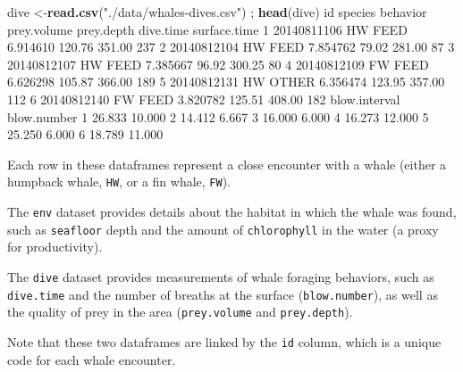 \documentclass[]{book}
\newenvironment{Shaded}{\begin{snugshade}}{\end{snugshade}}
\newcommand{\DecValTok}[1]{\textcolor[rgb]{0.00,0.00,0.81}{#1}}
\newcommand{\FloatTok}[1]{\textcolor[rgb]{0.00,0.00,0.81}{#1}}
\newcommand{\KeywordTok}[1]{\textcolor[rgb]{0.13,0.29,0.53}{\textbf{#1}}}
\newcommand{\NormalTok}[1]{#1}
\newcommand{\StringTok}[1]{\textcolor[rgb]{0.31,0.60,0.02}{#1}}
\begin{document}
\begin{Shaded}
\begin{Highlighting}[]
\NormalTok{dive <-}\KeywordTok{read.csv}\NormalTok{(}\StringTok{"./data/whales-dives.csv"}\NormalTok{) ; }\KeywordTok{head}\NormalTok{(dive)}
\NormalTok{           id species behavior prey.volume prey.depth dive.time surface.time}
\DecValTok{1} \DecValTok{20140811106}\NormalTok{      HW     FEED    }\FloatTok{6.914610}     \FloatTok{120.76}    \FloatTok{351.00}          \DecValTok{237}
\DecValTok{2} \DecValTok{20140812104}\NormalTok{      HW     FEED    }\FloatTok{7.854762}      \FloatTok{79.02}    \FloatTok{281.00}           \DecValTok{87}
\DecValTok{3} \DecValTok{20140812107}\NormalTok{      HW     FEED    }\FloatTok{7.385667}      \FloatTok{96.92}    \FloatTok{300.25}           \DecValTok{80}
\DecValTok{4} \DecValTok{20140812109}\NormalTok{      FW     FEED    }\FloatTok{6.626298}     \FloatTok{105.87}    \FloatTok{366.00}          \DecValTok{189}
\DecValTok{5} \DecValTok{20140812131}\NormalTok{      HW    OTHER    }\FloatTok{6.356474}     \FloatTok{123.95}    \FloatTok{357.00}          \DecValTok{112}
\DecValTok{6} \DecValTok{20140812140}\NormalTok{      FW     FEED    }\FloatTok{3.820782}     \FloatTok{125.51}    \FloatTok{408.00}          \DecValTok{182}
\NormalTok{  blow.interval blow.number}
\DecValTok{1}        \FloatTok{26.833}      \FloatTok{10.000}
\DecValTok{2}        \FloatTok{14.412}       \FloatTok{6.667}
\DecValTok{3}        \FloatTok{16.000}       \FloatTok{6.000}
\DecValTok{4}        \FloatTok{16.273}      \FloatTok{12.000}
\DecValTok{5}        \FloatTok{25.250}       \FloatTok{6.000}
\DecValTok{6}        \FloatTok{18.789}      \FloatTok{11.000}
\end{Highlighting}
\end{Shaded}

Each row in these dataframes represent a close encounter with a whale (either a humpback whale, \texttt{HW}, or a fin whale, \texttt{FW}).

The \texttt{env} dataset provides details about the habitat in which the whale was found, such as \texttt{seafloor} depth and the amount of \texttt{chlorophyll} in the water (a proxy for productivity).

The \texttt{dive} dataset provides measurements of whale foraging behaviors, such as \texttt{dive.time} and the number of breaths at the surface (\texttt{blow.number}), as well as the quality of prey in the area (\texttt{prey.volume} and \texttt{prey.depth}).

Note that these two dataframes are linked by the \texttt{id} column, which is a unique code for each whale encounter.
\end{document}
